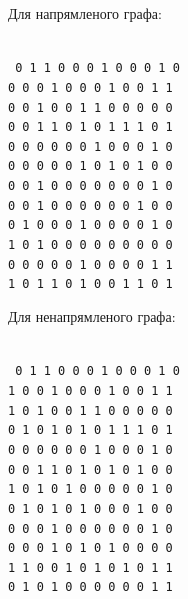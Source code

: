 \begin{minipage}[t]{0.4\linewidth}
  \begin{framed}
    \noindent%
    Для напрямленого графа:\\\\
    \raggedright\footnotesize\texttt{%
      0 1 1 0 0 0 1 0 0 0 1 0\\
      0 0 0 1 0 0 0 1 0 0 1 1\\
      0 0 1 0 0 1 1 0 0 0 0 0\\
      0 0 1 1 0 1 0 1 1 1 0 1\\
      0 0 0 0 0 0 1 0 0 0 1 0\\
      0 0 0 0 0 1 0 1 0 1 0 0\\
      0 0 1 0 0 0 0 0 0 0 1 0\\
      0 0 1 0 0 0 0 0 0 1 0 0\\
      0 1 0 0 0 1 0 0 0 0 1 0\\
      1 0 1 0 0 0 0 0 0 0 0 0\\
      0 0 0 0 0 1 0 0 0 0 1 1\\
      1 0 1 1 0 1 0 0 1 1 0 1\\
    }
  \end{framed}
\end{minipage}
\hfill
\begin{minipage}[t]{0.4\linewidth}
  \begin{framed}
    \noindent%
    Для ненапрямленого графа:\\\\
    \raggedright\footnotesize\texttt{%
      0 1 1 0 0 0 1 0 0 0 1 0\\
      1 0 0 1 0 0 0 1 0 0 1 1\\
      1 0 1 0 0 1 1 0 0 0 0 0\\
      0 1 0 1 0 1 0 1 1 1 0 1\\
      0 0 0 0 0 0 1 0 0 0 1 0\\
      0 0 1 1 0 1 0 1 0 1 0 0\\
      1 0 1 0 1 0 0 0 0 0 1 0\\
      0 1 0 1 0 1 0 0 0 1 0 0\\
      0 0 0 1 0 0 0 0 0 0 1 0\\
      0 0 0 1 0 1 0 1 0 0 0 0\\
      1 1 0 0 1 0 1 0 1 0 1 1\\
      0 1 0 1 0 0 0 0 0 0 1 1\\
    }
  \end{framed}
\end{minipage}
\hfill

